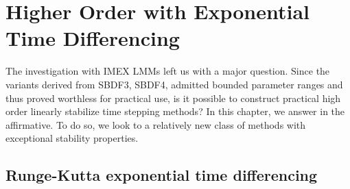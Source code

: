 \chapter{Higher Order with Exponential Time Differencing}
The investigation with IMEX LMMs left us with a major question. Since the variants derived from SBDF3, SBDF4, admitted bounded parameter ranges and thus proved worthless for practical use, is it possible to construct practical high order linearly stabilize time stepping methods? In this chapter, we answer in the affirmative. To do so, we look to a relatively new class of methods with exceptional stability properties. 

\section{Runge-Kutta exponential time differencing }
 